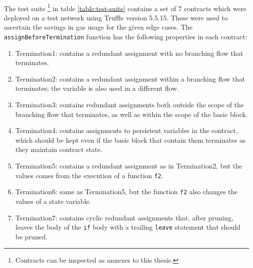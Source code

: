 
\paragraph*{}
The test suite \footnote{Contracts can be inspected as annexes to this thesis.} in table \ref{table:test-suite} contains a set of 7 contracts which were deployed on a test network using Truffle version 5.5.15. These were used to ascertain the savings in gas usage for the given edge cases. The \lstinline[columns=fixed]{assignBeforeTermination} function has the following properties in each contract:
\begin{enumerate}
    \item Termination1: contains a redundant assignment with no branching flow that terminates.
    \item Termination2: contains a redundant assignment within a branching flow that terminates; the variable is also used in a different flow.
    \item Termination3: contains redundant assignments both outside the scope of the branching flow that terminates, as well as within the scope of the basic block.
    \item Termination4: contains assignments to persistent variables in the contract, which should be kept even if the basic block that contain them terminates as they maintain contract state.
    \item Termination5: contains a redundant assignment as in Termination2, but the values comes from the execution of a function \lstinline[columns=fixed]{f2}. 
    \item Termination6: same as Termination5, but the function \lstinline[columns=fixed]{f2} also changes the values of a state variable.
    \item Termination7: contains cyclic redundant assignments that, after pruning, leaves the body of the \lstinline[columns=fixed]{if} body with a trailing \lstinline[columns=fixed]{leave} statement that should be pruned.
\end{enumerate}

